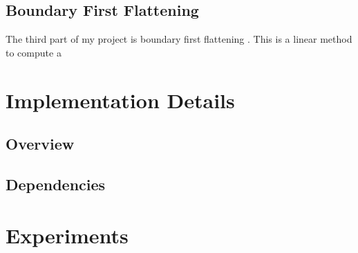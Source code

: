 \documentclass[fleqn,10pt]{wlscirep}
\begin{document}
\subsection{Boundary First Flattening}
The third part of my project is boundary first flattening \cite{1704.06873}. This is a linear method to compute a 




\section{Implementation Details}
\subsection{Overview}
\subsection{Dependencies}



\section{Experiments}

 






\end{document}
